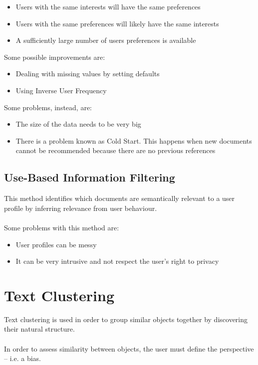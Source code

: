\documentclass{article}
\begin{document}
\begin{itemize}
	\item Users with the same interests will have the same preferences
	\item Users with the same preferences will likely have the same interests
	\item A sufficiently large number of users preferences is available
\end{itemize}
Some possible improvements are:

\begin{itemize}
	\item Dealing with missing values by setting defaults
	\item Using Inverse User Frequency
\end{itemize}
Some problems, instead, are:

\begin{itemize}
	\item The size of the data needs to be very big
	\item There is a problem known as Cold Start. This happens when new documents cannot be recommended because there are no previous references
\end{itemize}

\subsection{Use-Based Information Filtering}
This method identifies which documents are semantically relevant to a user profile by inferring relevance from user behaviour. \\ \\
Some problems with this method are:

\begin{itemize}
	\item User profiles can be messy
	\item It can be very intrusive and not respect the user's right to privacy
\end{itemize}

\section{Text Clustering}
Text clustering is used in order to group similar objects together by discovering their natural structure. \\ \\
In order to assess similarity between objects, the user must define the perspective -- i.e. a bias.
\end{document}
